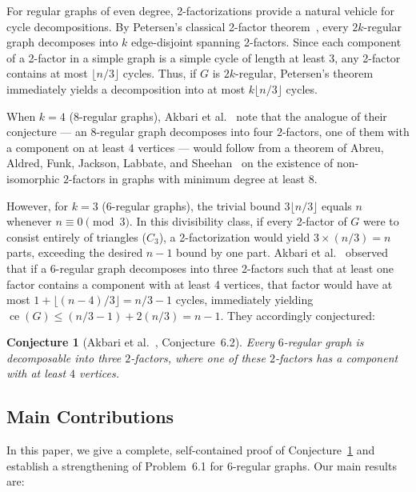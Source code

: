 \documentclass[11pt,reqno]{amsart}
\newtheorem{conjecture}[theorem]{Conjecture}
\theoremstyle{definition}
\theoremstyle{remark}
\DeclareMathOperator{\ce}{ce}
\begin{document}
For regular graphs of even degree, 2-factorizations provide a natural vehicle for cycle decompositions. By Petersen's classical 2-factor theorem~\cite{Pe91}, every $2k$-regular graph decomposes into $k$ edge-disjoint spanning 2-factors. Since each component of a 2-factor in a simple graph is a simple cycle of length at least $3$, any 2-factor contains at most $\lfloor n/3 \rfloor$ cycles. Thus, if $G$ is $2k$-regular, Petersen's theorem immediately yields a decomposition into at most $k \lfloor n/3 \rfloor$ cycles. 

When $k = 4$ ($8$-regular graphs), Akbari et al.~\cite{AABC25} note that the analogue of their conjecture --- an $8$-regular graph decomposes into four $2$-factors, one of them with a component on at least $4$ vertices --- would follow from a theorem of Abreu, Aldred, Funk, Jackson, Labbate, and Sheehan~\cite{AAFJLS04} on the existence of non-isomorphic $2$-factors in graphs with minimum degree at least $8$.

However, for $k = 3$ ($6$-regular graphs), the trivial bound $3 \lfloor n/3 \rfloor$ equals $n$ whenever $n \equiv 0 \pmod 3$. In this divisibility class, if every 2-factor of $G$ were to consist entirely of triangles ($C_3$), a 2-factorization would yield $3 \times (n/3) = n$ parts, exceeding the desired $n-1$ bound by one part. Akbari et al.~\cite{AABC25} observed that if a $6$-regular graph decomposes into three 2-factors such that at least one factor contains a component with at least 4 vertices, that factor would have at most $1 + \lfloor (n-4)/3 \rfloor = n/3 - 1$ cycles, immediately yielding $\ce(G) \le (n/3 - 1) + 2(n/3) = n-1$. They accordingly conjectured:

\begin{conjecture}[Akbari et al.~\cite{AABC25}, Conjecture~6.2]\label{conj:aabc-6.2}
Every $6$-regular graph is decomposable into three $2$-factors, where one of these $2$-factors has a component with at least $4$ vertices.
\end{conjecture}

\subsection*{Main Contributions}
In this paper, we give a complete, self-contained proof of Conjecture~\ref{conj:aabc-6.2} and establish a strengthening of Problem~6.1 for $6$-regular graphs. Our main results are:
\end{document}
